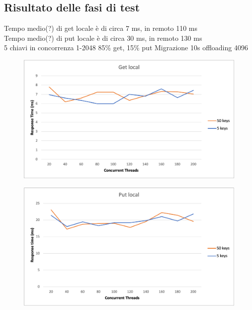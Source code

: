 \documentclass[conference]{IEEEtran}
\begin{document}
\subsection{Risultato delle fasi di test}
Tempo medio(?) di get locale è di circa 7 ms, in remoto 110 ms\\
Tempo medio(?) di put locale è di circa 30 ms, in remoto 130 ms\\
5 chiavi in concorrenza 1-2048
85\% get, 15\% put Migrazione 10s offloading 4096
\begin{figure}[h]
  \includegraphics[scale=0.5]{images/getlocal.png}
\end{figure}
\begin{figure}[h]
  \includegraphics[scale=0.5]{images/putlocal.png}
\end{figure}
\end{document}
